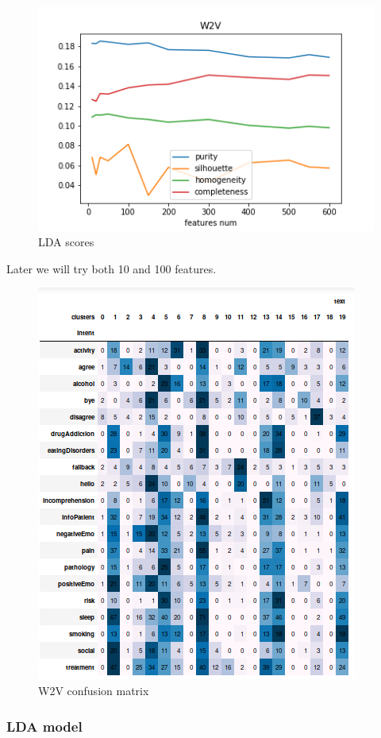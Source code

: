 \documentclass[11pt]{article}
\begin{document}
\begin{figure}[h]
\centering
 	\includegraphics[scale=0.7]{w2v_scores.png}
	\caption{LDA scores}
\label{w2v_scores}
\end{figure}
\FloatBarrier

Later we will try both 10 and 100 features.

\begin{figure}[h]
	\centering
 	\includegraphics[scale=0.7]{best_w2v_cm.png}
	\caption{W2V confusion matrix}
 \label{w2v_cm_mat}
 \end{figure}
\FloatBarrier

\subsubsection{LDA model}
\end{document}
